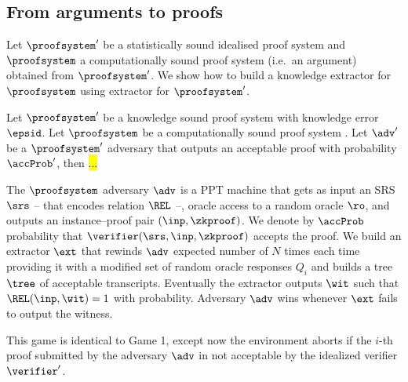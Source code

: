\subsection{From arguments to proofs}
%
%
%
Let $\proofsystem'$ be a statistically sound idealised proof system and $\proofsystem$ a
computationally sound proof system (i.e.~an argument) obtained from $\proofsystem'$. We
show how to build a knowledge extractor for $\proofsystem$ using extractor for $\proofsystem'$.

\begin{lemma}
  Let $\proofsystem'$ be a knowledge sound proof system with knowledge error
  $\epsid$. Let $\proofsystem$ be a computationally sound proof system . Let $\adv'$ be a $\proofsystem'$
  adversary that outputs an acceptable proof with probability $\accProb'$, then \hl{...}  
\end{lemma}


The $\proofsystem$ adversary $\adv$ is a PPT machine that gets as input an SRS $\srs$ --
that encodes relation $\REL$ --, oracle access to a random oracle $\ro$, and outputs an
instance--proof pair $(\inp, \zkproof)$. We denote by $\accProb$ probability that
$\verifier (\srs, \inp, \zkproof)$ accepts the proof. We build an extractor $\ext$ that
rewinds $\adv$ expected number of $N$ times each time providing it with a modified set of
random oracle responses $Q_i$ and builds a tree $\tree$ of acceptable transcripts.
Eventually the extractor outputs $\wit$ such that $\REL(\inp, \wit) = 1$ with
 probability.  Adversary $\adv$ wins whenever $\ext$ fails to
output the witness.

This game is identical to Game 1, except now the environment aborts if the $i$-th proof
submitted by the adversary $\adv$ in not acceptable by the idealized verifier
$\verifier'$.



